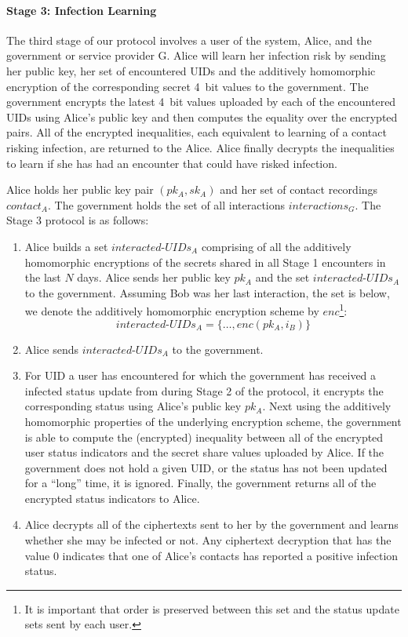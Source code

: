 \documentclass{article}
\begin{document}
\paragraph{Stage 3: Infection Learning}
The third stage of our protocol involves a user of the system, Alice, and the government or service provider G. Alice will learn her infection risk by sending her public key, her set of encountered UIDs and the additively homomorphic encryption of the corresponding secret 4~bit values to the government. The government encrypts the latest 4~bit values uploaded by each of the encountered UIDs using Alice's public key and then computes the equality over the encrypted pairs. All of the encrypted inequalities, each equivalent to learning of a contact risking infection, are returned to the Alice. Alice finally decrypts the inequalities to learn if she has had an encounter that could have risked infection.

Alice holds her public key pair $(pk_A, sk_A)$ and her set of contact recordings $contact_A$. The government holds the set of all interactions $\mathit{interactions}_G$. The Stage 3 protocol is as follows: 

\begin{enumerate}
    \item Alice builds a set $\mathit{interacted\text{-}UIDs_A}$ comprising of all the additively homomorphic encryptions of the secrets shared in all Stage 1 encounters in the last $N$ days. Alice sends her public key $pk_A$ and the set  $\mathit{interacted\text{-}UIDs_A}$ to the government. Assuming Bob was her last interaction, the set is below, we denote the additively homomorphic encryption scheme by $\mathit{enc}$\footnote{It is important that order is preserved between this set and the status update sets sent by each user.}:
$$\mathit{interacted\text{-}UIDs_A} = \{\dots,  \mathit{enc}(pk_A,i_B)\}$$ 
    \item Alice sends $\mathit{interacted\text{-}UIDs_A}$ to the government. 
    
    \item For UID a user has encountered for which the government has received a infected status update from during Stage 2 of the protocol, it encrypts the corresponding status using Alice's public key $pk_A$. Next using the additively homomorphic properties of the underlying encryption scheme, the government is able to compute the (encrypted) inequality between all of the encrypted user status indicators  and the secret share values uploaded by Alice. If the government does not hold a given UID, or the status has not been updated for a ``long'' time, it is ignored. Finally, the government returns all of the encrypted status indicators to Alice. 
    
    \item Alice decrypts all of the ciphertexts sent to her by the government and learns whether she may be infected or not. Any ciphertext decryption that has the value 0 indicates that one of Alice's contacts has reported a positive infection status. 
    
\end{enumerate}
\end{document}
